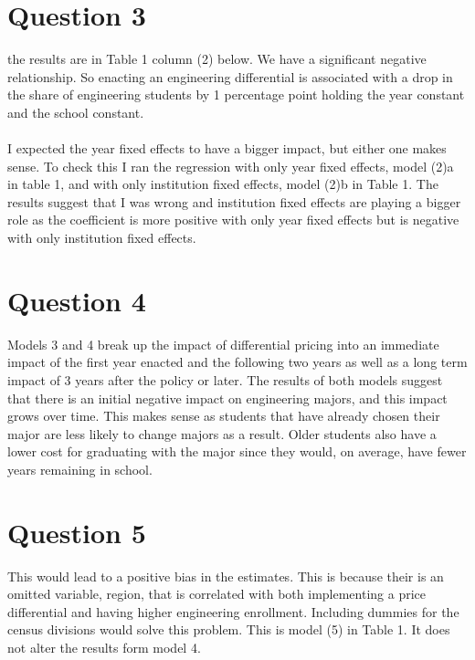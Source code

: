 \documentclass[11pt]{article}
\begin{document}
\section{Question 3}
the results are in Table 1 column (2) below. We have a significant negative relationship. So enacting an engineering differential is associated with a drop in the share of engineering students by 1 percentage point holding the year constant and the school constant. \\ \\ 

I expected the year fixed effects to have a bigger impact, but either one makes sense. To check this I ran the regression with only year fixed effects, model (2)a in table 1, and with only institution fixed effects, model (2)b in Table 1. The results suggest that I was wrong and institution fixed effects are playing a bigger role as the coefficient is more positive with only year fixed effects but is negative with only institution fixed effects. 


\section{Question 4}

Models 3 and 4 break up the impact of differential pricing into an immediate impact of the first year enacted and the following two years as well as a long term impact of 3 years after the policy or later. The results of both models suggest that there is an initial negative impact on engineering majors, and this impact grows over time. This makes sense as students that have already chosen their major are less likely to change majors as a result. Older students also have a lower cost for graduating with the major since they would, on average, have fewer years remaining in school. 


\section{Question 5}

This would lead to a positive bias in the estimates. This is because their is an omitted variable, region, that is correlated with both implementing a price differential and having higher engineering enrollment. Including dummies for the census divisions would solve this problem. This is model (5) in Table 1. It does not alter the results form model 4. 
\end{document}
